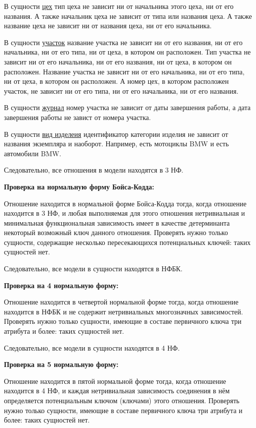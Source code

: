В сущности \underline{цех} тип цеха не зависит ни от начальника этого цеха, ни от его названия.
А также начальник цеха не зависит от типа или названия цеха.
А также название цеха не зависит ни от названия цеха, ни от его начальника.

В сущности \underline{участок} название участка не зависит ни от его названия, ни от его начальника, ни от его типа, ни от цеха, в котором он расположен.
Тип участка не зависит ни от его начальника, ни от его названия, ни от цеха, в котором он расположен.
Название участка не зависит ни от его начальника, ни от его типа, ни от цеха, в котором он расположен.
А номер цех, в котором расположен участок, не зависит ни от его типа, ни от его начальника, ни от его названия.

В сущности \underline{журнал} номер участка не зависит от даты завершения работы, а дата завершения работы не завист от номера участка.

В сущности \underline{вид изделеия} идентификатор категории изделия не зависит от названия экземпляра и наоборот.
Например, есть мотоциклы BMW и есть автомобили BMW.

Следовательно, все отношения в модели находятся в 3 НФ.

{\bf Проверка на нормальную форму Бойса-Кодда:}

Отношение находится в нормальной форме Бойса-Кодда тогда, когда отношение находится в 3 НФ, и любая выполняемая для этого отношения нетривиальная и минимальная функциональная зависимость имеет в качестве детерминанта некоторый возможный ключ данного отношения.
Проверять нужно только сущности, содержащие несколько пересекающихся потенциальных ключей: таких сущностей нет.

Следовательно, все модели в сущности находятся в НФБК.

{\bf Проверка на 4 нормальную форму:}

Отношение находится в четвертой нормальной форме тогда, когда отношение находится в НФБК и не содержит нетривиальных многозначных зависимостей.
Проверять нужно только сущности, имеющие в составе первичного ключа три атрибута и более: таких сущностей нет.

Следовательно, все модели в сущности находятся в 4 НФ.

{\bf Проверка на 5 нормальную форму:}

Отношение находится в пятой нормальной форме тогда, когда отношение находится в 4 НФ, и каждая нетривиальная зависимость соединения в нём определяется потенциальным ключом (ключами) этого отношения.
Проверять нужно только сущности, имеющие в составе первичного ключа три атрибута и более: таких сущностей нет.

